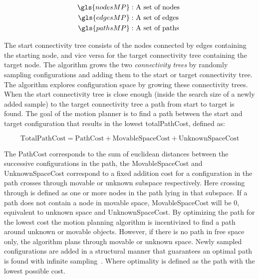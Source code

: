 \begin{center}
\begin{align*}
  \gls{nodesMP}:& \textrm{ A set of nodes }\\
  \gls{edgesMP}:& \textrm{ A set of edges }\\
  \gls{pathsMP}:& \textrm{ A set of paths }
\end{align*}
\end{center}

The start connectivity tree consists of the nodes connected by edges containing the starting node, and vice versa for the target connectivity tree containing the target node. The algorithm grows the two \textit{connectivity trees} by randomly sampling configurations and adding them to the start or target connectivity tree. The algorithm explores configuration space by growing these connectivity trees. When the start connectivity tree is close enough (inside the search size of a newly added sample) to the target connectivity tree a path from start to target is found. The goal of the motion planner is to find a path between the start and target configuration that results in the lowest totalPathCost, defined as:

\[\textrm{TotalPathCost} = \textrm{PathCost} + \textrm{MovableSpaceCost} + \textrm{UnknownSpaceCost}\]

The PathCost corresponds to the sum of euclidean distances between the successive configurations in the path, the MovableSpaceCost and UnknownSpaceCost correspond to a fixed addition cost for a configuration in the path crosses through movable or unknown subspace respectively. Here crossing through is defined as one or more nodes in the path lying in that subspace. If a path does not contain a node in movable space, MovableSpaceCost will be 0, equivalent to unknown space and UnknownSpaceCost. By optimizing the path for the lowest cost the motion planning algorithm is incentivized to find a path around unknown or movable objects. However, if there is no path in free space only, the algorithm plans through movable or unknown space. Newly sampled configurations are added in a structural manner that guarantees an optimal path is found with infinite sampling~\cite{chen_fast_2018}. Where optimality is defined as the path with the lowest possible cost.\bs

